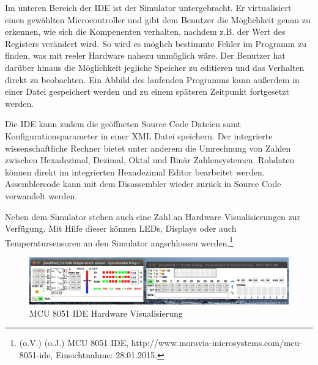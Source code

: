 Im unteren Bereich der \ac{IDE} ist der Simulator untergebracht. Er virtualisiert einen gewählten
Microcontroller und gibt dem Benutzer die Möglichkeit genau zu erkennen, wie sich die Kompenenten
verhalten, nachdem z.B. der Wert des Registers verändert wird. So wird es möglich bestimmte Fehler
im Programm zu finden, was mit reeler Hardware nahezu unmöglich wäre. Der Benutzer hat darüber
hinaus die Möglichkeit jegliche Speicher zu editieren und das Verhalten direkt zu beobachten. Ein
Abbild des laufenden Programms kann außerdem in einer Datei gespeichert werden und zu einem späteren
Zeitpunkt fortgesetzt werden.

Die \ac{IDE} kann zudem die geöffneten Source Code Dateien samt Konfigurationsparameter in einer
\ac{XML} Datei speichern. Der integrierte wissenschaftliche Rechner bietet unter anderem die
Umrechnung von Zahlen zwischen Hexadezimal, Dezimal, Oktal und Binär Zahlensystemen. Rohdaten können
direkt im integrierten Hexadezimal Editor bearbeitet werden. Assemblercode kann mit dem Disassembler
wieder zurück in Source Code verwandelt werden.

Neben dem Simulator stehen auch eine Zahl an Hardware Visualisierungen zur Verfügung. Mit Hilfe
dieser können \ac{LED}s, Displays oder auch Temperatursensoren an den Simulator angschlossen
werden.\footnote{(o.V.) (o.J.) MCU 8051 IDE, http://www.moravia-microsystems.com/mcu-8051-ide,
  Einsichtnahme: 28.01.2015.}

\begin{figure}[htbp]
\centering
\includegraphics{images/display-temp.png}
\caption{MCU 8051 IDE Hardware Visualisierung}
\end{figure}